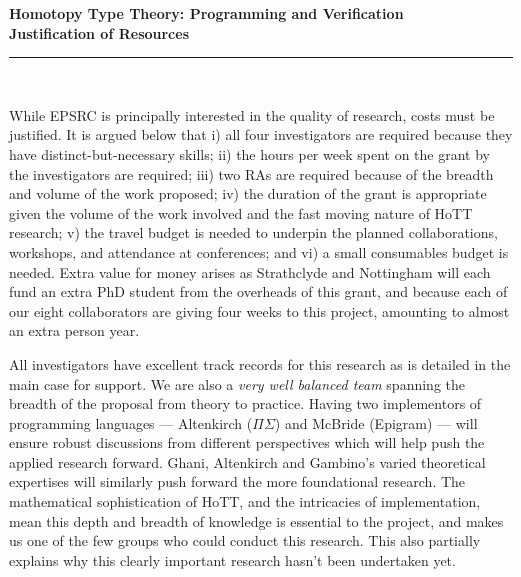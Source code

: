 \documentclass[a4paper,11pt]{article}
\begin{document}
\thispagestyle{plain}
\begin{center}
  {\Large \bf Homotopy Type Theory: Programming and Verification\\
\vspace{0.15in}
  Justification of Resources}\\[1ex]

\vspace*{-0.1in}

\rule{160mm}{.5mm}\\[2ex]
\end{center}

\noindent While EPSRC is principally interested in the quality of
research, costs must be justified. It is argued below that i) all four
investigators are required because they have
distinct-but-necessary skills; ii) the hours per week spent on
the grant by the investigators are required; iii)  two RAs are required because of the
breadth and volume of the work proposed; iv) the duration of the
grant is appropriate given the volume of the work involved and the
fast moving nature of HoTT research; v) the travel budget
is needed to underpin the planned collaborations, workshops, and
attendance at conferences; and vi) a small consumables budget is
needed. Extra value for money arises
as Strathclyde and Nottingham 
will each fund an extra PhD student from the overheads of this grant, and
because each of our eight collaborators are giving four weeks  to
this project, amounting to almost an extra person year.

\vspace{0.02in}

All investigators have excellent track records for this research as is
detailed in the main case for support.  We are also a {\em very well
  balanced team} spanning the breadth of the proposal from theory to
practice. Having two implementors of programming languages ---
Altenkirch ($\Pi\Sigma$) and McBride (Epigram) --- will ensure robust
discussions from different perspectives which will help push the
applied research forward. Ghani, Altenkirch and Gambino's varied
theoretical expertises will similarly push forward the more
foundational research. The mathematical sophistication of HoTT, and
the intricacies of implementation, mean this depth and breadth of
knowledge is essential to the project, and makes us one of the few groups
who could conduct this research. This also partially explains why this
clearly important research hasn't been undertaken yet.
\end{document}
